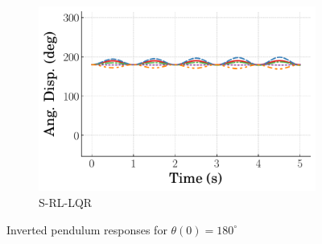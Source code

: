\begin{figure}[tb]
    \hfill
    \begin{subfigure}[b]{0.49\textwidth}
        \centering
        \includegraphics[width=\textwidth]{figures/figures_RL_model_based_control/time_responses_invpend/invpend_switching/Angular_displacement_180_init_0_steps.pdf}
        \caption{S-RL-LQR}
        \label{subfig_chap2:invpend_resp_0steps_S_RL_LQR}
    \end{subfigure}
    \caption{Inverted pendulum responses for $\theta(0)=180^{\circ}$}
    \label{fig_chap2:invpend_resp_0steps}
\end{figure}
%

